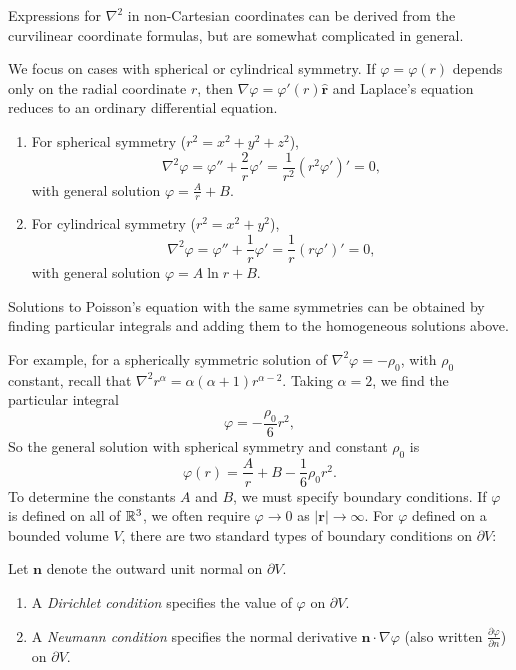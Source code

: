 \documentclass[a4paper]{article}
\begin{document}
\begin{rmk}
  Expressions for $\nabla^2$ in non-Cartesian coordinates can be derived from the curvilinear coordinate formulas, but are somewhat complicated in general.
\end{rmk}

We focus on cases with spherical or cylindrical symmetry. If $\varphi = \varphi(r)$ depends only on the radial coordinate $r$, then $\nabla \varphi = \varphi'(r)\hat{\mathbf{r}}$ and Laplace's equation reduces to an ordinary differential equation.

\begin{prop}
  \leavevmode
  \begin{enumerate}
    \item For spherical symmetry ($r^2 = x^2 + y^2 + z^2$),
      \[
        \nabla^2 \varphi = \varphi'' + \frac{2}{r}\varphi' = \frac{1}{r^2}(r^2\varphi')' = 0,
      \]
      with general solution $\varphi = \frac{A}{r} + B$.
    \item For cylindrical symmetry ($r^2 = x^2 + y^2$),
      \[
        \nabla^2 \varphi = \varphi'' + \frac{1}{r}\varphi' = \frac{1}{r}(r\varphi')' = 0,
      \]
      with general solution $\varphi = A\ln r + B$.
  \end{enumerate}
\end{prop}

Solutions to Poisson's equation with the same symmetries can be obtained by finding particular integrals and adding them to the homogeneous solutions above.

For example, for a spherically symmetric solution of $\nabla^2 \varphi = -\rho_0$, with $\rho_0$ constant, recall that $\nabla^2 r^\alpha = \alpha(\alpha + 1)r^{\alpha - 2}$. Taking $\alpha = 2$, we find the particular integral
\[
  \varphi = -\frac{\rho_0}{6}r^2,
\]
So the general solution with spherical symmetry and constant $\rho_0$ is
\[
  \varphi(r) = \frac{A}{r} + B - \frac{1}{6}\rho_0 r^2.
\]
To determine the constants $A$ and $B$, we must specify boundary conditions. If $\varphi$ is defined on all of $\mathbb{R}^3$, we often require $\varphi \to 0$ as $|\mathbf{r}| \to \infty$. For $\varphi$ defined on a bounded volume $V$, there are two standard types of boundary conditions on $\partial V$:

\begin{defi}
  Let $\mathbf{n}$ denote the outward unit normal on $\partial V$.
  \begin{enumerate}
    \item A \emph{Dirichlet condition} specifies the value of $\varphi$ on $\partial V$.
    \item A \emph{Neumann condition} specifies the normal derivative $\mathbf{n}\cdot \nabla \varphi$ (also written $\frac{\partial \varphi}{\partial n}$) on $\partial V$.
  \end{enumerate}
\end{defi}
\end{document}
